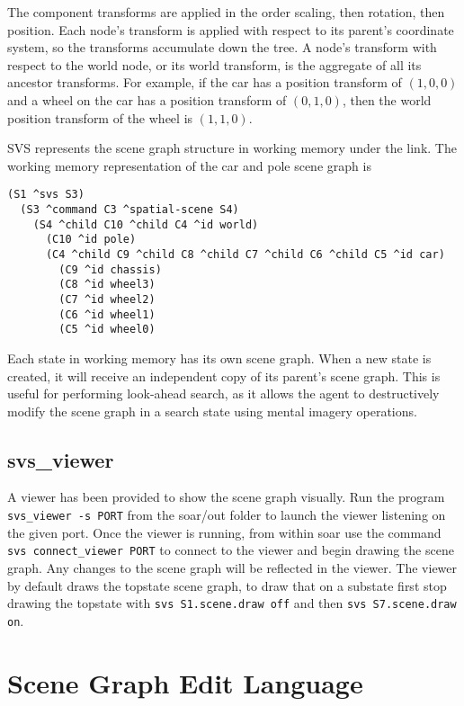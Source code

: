 The component transforms are applied in the order scaling, then rotation, then position.
Each node's transform is applied with respect to its parent's coordinate system, so the transforms accumulate down the tree.
A node's transform with respect to the world node, or its world transform, is the aggregate of all its ancestor transforms.
For example, if the car has a position transform of $(1,0,0)$ and a wheel on the car has a position transform of $(0,1,0)$, then the world position transform of the wheel is $(1,1,0)$.

SVS represents the scene graph structure in working memory under the  link.
The working memory representation of the car and pole scene graph is

\begin{verbatim}
(S1 ^svs S3)
  (S3 ^command C3 ^spatial-scene S4)
    (S4 ^child C10 ^child C4 ^id world)
      (C10 ^id pole)
      (C4 ^child C9 ^child C8 ^child C7 ^child C6 ^child C5 ^id car)
        (C9 ^id chassis)
        (C8 ^id wheel3)
        (C7 ^id wheel2)
        (C6 ^id wheel1)
        (C5 ^id wheel0)
\end{verbatim}

Each state in working memory has its own scene graph.
When a new state is created, it will receive an independent copy of its parent's scene graph.
This is useful for performing look-ahead search, as it allows the agent to destructively modify the scene graph in a search state using mental imagery operations.

\subsection{svs\_viewer}

A viewer has been provided to show the scene graph visually. 
Run the program \texttt{svs\_viewer -s PORT} from the soar/out folder 
to launch the viewer listening on the given port. Once the viewer is running, 
from within soar use the command \texttt{svs connect\_viewer PORT} to connect 
to the viewer and begin drawing the scene graph. Any changes to the scene graph
will be reflected in the viewer. The viewer by default draws the topstate scene graph, 
to draw that on a substate first stop drawing the topstate with 
\texttt{svs S1.scene.draw off} and then \texttt{svs S7.scene.draw on}. 

\section{Scene Graph Edit Language}

